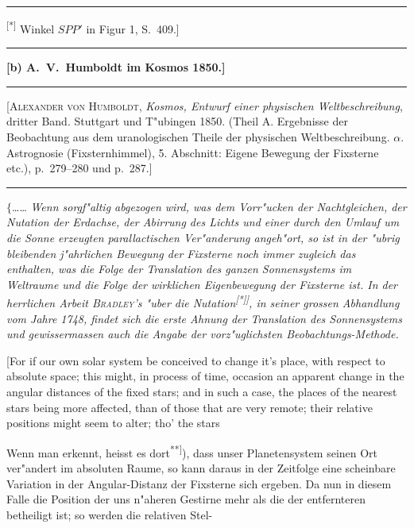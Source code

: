 \documentclass[12pt,a4paper]{article}
\theoremstyle{plain}
\theoremstyle{definition}
\theoremstyle{remark}
\begin{document}
{\rule{\textwidth}{0.4pt}
{\small
\textsuperscript{[*]} Winkel $SPP'$ in Figur 1, S.\ 409.]
}
\rule{\textwidth}{0.4pt}


\newpage
\begin{center}
\textbf{[b) A.\ V.\ Humboldt im \glq{}Kosmos\grq{} 1850.]}
\end{center}

\rule{\textwidth}{0.4pt}
\begin{center}
\small
[\textsc{Alexander von Humboldt}, {\itshape Kosmos, Entwurf einer physischen Weltbeschreibung}, dritter Band. Stuttgart und T"ubingen 1850. (Theil A. Ergebnisse der Beobachtung aus dem uranologischen Theile der physischen Weltbeschreibung. $\alpha$. Astrognosie (Fixsternhimmel), 5. Abschnitt: Eigene Bewegung der Fixsterne etc.), p.\ 279--280 und p.\ 287.]
\end{center}
\rule{\textwidth}{0.4pt}

\vspace{1em}
\noindent
$\{$\ldots{}\ldots{} {\itshape Wenn sorgf"altig abgezogen wird, was dem Vorr"ucken der Nachtgleichen, der Nutation der Erdachse, der Abirrung des Lichts und einer durch den Umlauf um die Sonne erzeugten parallactischen Ver"anderung angeh"ort, so ist in der "ubrig bleibenden j"ahrlichen Bewegung der Fixsterne noch immer zugleich das enthalten, was die Folge der Translation des ganzen Sonnensystems im Weltraume und die Folge der wirklichen Eigenbewegung der Fixsterne ist. In der herrlichen Arbeit \textsc{Bradley}'s "uber die Nutation\textsuperscript{[*]]}, in seiner grossen Abhandlung vom Jahre 1748, findet sich die erste Ahnung der Translation des Sonnensystems und gewissermassen auch die Angabe der vorz"uglichsten Beobachtungs-Methode.}

\vspace{1em}
\begin{minipage}[t]{0.48\textwidth}
\small
[For if our own solar system be conceived to change it's place, with respect to absolute space; this might, in process of time, occasion an apparent change in the angular distances of the fixed stars; and in such a case, the places of the nearest stars being more affected, than of those that are very remote; their relative positions might seem to alter; tho' the stars
\end{minipage}
\hfill
\begin{minipage}[t]{0.48\textwidth}
\small
\glq\glq{}Wenn man erkennt\grq\grq{}, heisst es dort\textsuperscript{**]}), \glq\glq{}dass unser Planetensystem seinen Ort ver"andert im absoluten Raume, so kann daraus in der Zeitfolge eine scheinbare Variation in der Angular-Distanz der Fixsterne sich ergeben. Da nun in diesem Falle die Position der uns n"aheren Gestirne mehr als die der entfernteren betheiligt ist; so werden die relativen Stel-
\end{minipage}

}
\end{document}
